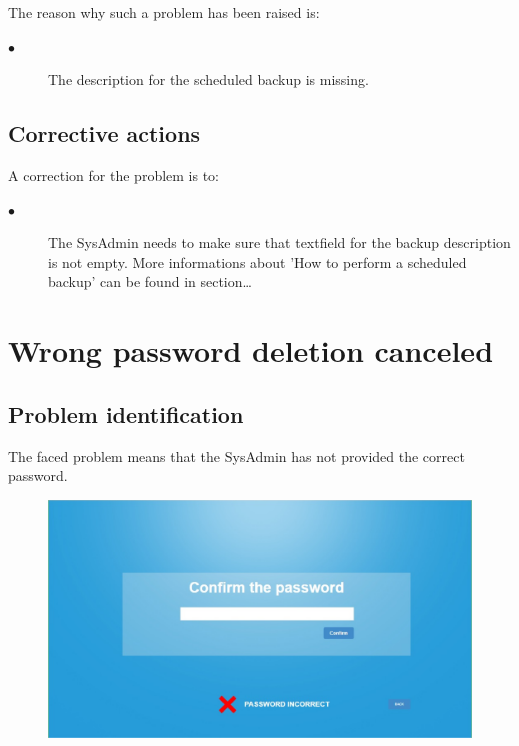 The reason why such a problem has been raised is:\\
\begin{description}
\item[$\bullet$] The description for the scheduled backup is missing.
\end{description}


\subsection{Corrective actions}

A correction for the problem is to:\\
\begin{description}
\item[$\bullet$] The SysAdmin needs to make sure that textfield for the backup
description is not empty. More informations about 'How to perform a scheduled
backup' can be found in section\ldots

\end{description}










\section{Wrong password deletion canceled} 

\subsection{Problem identification}
The faced problem means that the SysAdmin has not provided the correct password.

\begin{figure}[H]
\centering
\includegraphics[width=170mm]{images/wrongpassword.eps}
\caption{\label{overflow}}
\end{figure}

